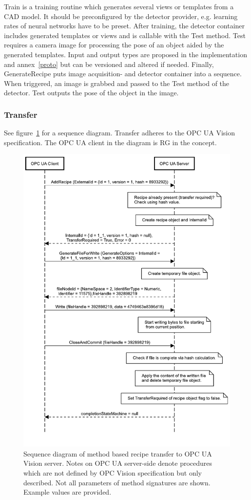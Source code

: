Train is a training routine which generates several views or templates from a CAD model. It should be preconfigured by the detector provider, e.g. learning rates of neural networks have to be preset. After training, the detector container includes generated templates or views and is callable with the Test method.  Test requires a camera image for processing the pose of an object aided by the generated templates.  Input and output types are proposed in the implementation and annex~\ref{proto} but can be versioned and altered if needed. Finally, GenerateRecipe puts image acquisition- and detector container into a sequence. When triggered, an image is grabbed and passed to the Test method of the detector. Test outputs the pose of the object in the image.

\subsubsection{Transfer}
See figure~\ref{fig:runtimeviewgen} for a sequence diagram. Transfer adheres to the OPC UA Vision specification. The OPC UA client in the diagram is RG in the concept.
\begin{figure}
    \centering
    \includegraphics[height=0.9\textheight]{img/OPCUAVisionAddRecipe.pdf}
    \caption[Sequence diagram of method based recipe transfer]{Sequence diagram of method based recipe transfer to OPC UA Vision server. Notes on OPC UA server-side denote procedures which are not defined by OPC Vision specification but only described. Not all parameters of method signatures are shown. Example values are provided.}
    \label{fig:runtimeviewgen}
\end{figure}
